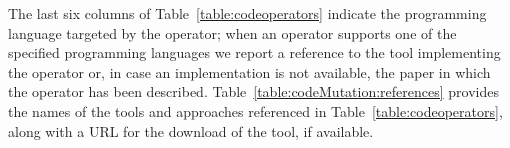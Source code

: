 \newcommand{\OffuttADA}{\cite{offutt1996mutation}}
\newcommand{\MUSIC}{\cite{phan2018music}}
\newcommand{\Sciror}{\cite{hariri2018srciror}}
\newcommand{\Mull}{\cite{denisov2018mull}}
\newcommand{\Accmut}{\cite{wang2017faster}}
\newcommand{\Major}{\cite{just2014major}}
\newcommand{\MuJava}{\cite{ma2006mujava}}
\newcommand{\TuyaSQL}{\cite{tuya2007mutating}}
\newcommand{\BinhSimulink}{\cite{binh2012mutation}}
\newcommand{\Proteum}{\cite{delamaro2001interface}}
\newcommand{\Shahriar}{\cite{shahriar2008mutation}} %
\newcommand{\SMT}{\cite{dan2012semantic}}
\newcommand{\MUSICShahriar}{\cite{shahriar2008music}}
\newcommand{\MuCPP}{\cite{delgado2017assessment}}
\newcommand{\jMINT}{\cite{grechanik2016mutation}}
\newcommand{\ILMutator}{\cite{derezinska2011object}}
\newcommand{\SQLChan}{\cite{chan2005fault}}
\newcommand{\BacterioSystem}{\cite{mateo2012validating}}
\newcommand{\Milu}{\cite{jia2008milu}}
\newcommand{\Judy}{\cite{madeyski2010judy}}


The last six columns of Table~\ref{table:codeoperators} indicate the programming language targeted by the operator; when an operator supports one of the specified programming languages we report a reference to the tool implementing the operator or, in case an implementation is not available, the paper in which the operator has been described. 
Table~\ref{table:codeMutation:references} provides the names of the tools and approaches referenced in Table~\ref{table:codeoperators}, along with a URL for the download of the tool, if available.





